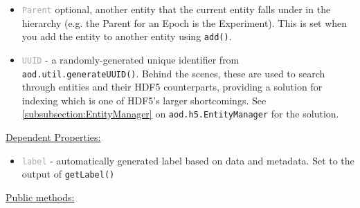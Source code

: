 \documentclass[10pt]{exam}
\newcommand\myurl[1]{\textcolor{blue}{\underline{#1}}}
\newcommand\aodclass[1]{\textcolor{codeblue}{\texttt{#1}}}
\newcommand\aodprop[1]{\textcolor{darkgray}{\texttt{#1}}}
\newcommand\aodfcn[1]{\textcolor{darkteal}{\texttt{#1}}}
\newcommand\docheader[1]{\vspace{0.6ex}\noindent\underline{#1}\vspace{0.15ex}}
\begin{document}
		\begin{itemize}
			\item \aodprop{Parent} optional, another entity that the current entity falls under in the  hierarchy (e.g. the Parent for an Epoch is the Experiment). This is set when you add the entity to another entity using \aodfcn{add()}.
			\item \aodprop{UUID} - a randomly-generated unique identifier from \aodfcn{aod.util.generateUUID()}. Behind the scenes, these are used to search through entities and their HDF5 counterparts, providing a solution for indexing which is one of HDF5's larger shortcomings. See \myurl{\ref{subsubsection:EntityManager}} on \aodclass{aod.h5.EntityManager} for the solution.
		\end{itemize}
		\docheader{Dependent Properties:} 
		\begin{itemize}
			\item \aodprop{label} - automatically generated label based on data and metadata. Set to the output of \aodfcn{getLabel()}
		\end{itemize}
		\docheader{Public methods:}
\end{document}
